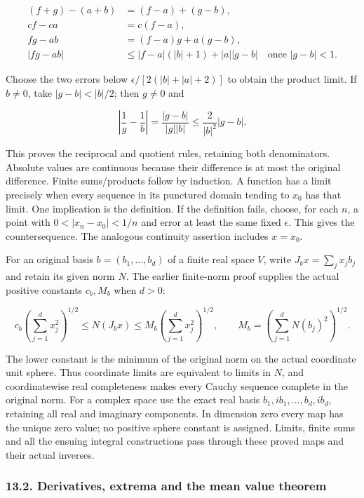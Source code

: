 \documentclass[
  11pt,
]{article}
\begin{document}
\[
\begin{aligned}
 (f+g)-(a+b)&=(f-a)+(g-b),\\
 cf-ca&=c(f-a),\\
 fg-ab&=(f-a)g+a(g-b),\\
 |fg-ab|&\le |f-a|(|b|+1)+|a||g-b|
 \quad\text{once }|g-b|<1.
\end{aligned}\tag{OC1}
\]

Choose the two errors below \(\epsilon/[2(|b|+|a|+2)]\) to obtain the
product limit. If \(b\ne0\), take \(|g-b|<|b|/2\); then \(g\ne0\) and

\[
 \left|\frac1g-\frac1b\right|
 =\frac{|g-b|}{|g||b|}
 \le\frac{2}{|b|^2}|g-b|.
\tag{OC2}
\]

This proves the reciprocal and quotient rules, retaining both
denominators. Absolute values are continuous because their difference is
at most the original difference. Finite sums/products follow by
induction. A function has a limit precisely when every sequence in its
punctured domain tending to \(x_0\) has that limit. One implication is
the definition. If the definition fails, choose, for each \(n\), a point
with \(0<|x_n-x_0|<1/n\) and error at least the same fixed \(\epsilon\).
This gives the countersequence. The analogous continuity assertion
includes \(x=x_0\).

For an original basis \(b=(b_1,\ldots,b_d)\) of a finite real space
\(V\), write \(J_bx=\sum_jx_jb_j\) and retain its given norm \(N\). The
earlier finite-norm proof supplies the actual positive constants
\(c_b,M_b\) when \(d>0\):

\[
 c_b\left(\sum_{j=1}^d x_j^2\right)^{1/2}
 \le N(J_bx)\le
 M_b\left(\sum_{j=1}^d x_j^2\right)^{1/2},
 \qquad
 M_b=\left(\sum_{j=1}^d N(b_j)^2\right)^{1/2}.
\tag{OC3}
\]

The lower constant is the minimum of the original norm on the actual
coordinate unit sphere. Thus coordinate limits are equivalent to limits
in \(N\), and coordinatewise real completeness makes every Cauchy
sequence complete in the original norm. For a complex space use the
exact real basis \(b_1,ib_1,\ldots,b_d,ib_d\), retaining all real and
imaginary components. In dimension zero every map has the unique zero
value; no positive sphere constant is assigned. Limits, finite sums and
all the ensuing integral constructions pass through these proved maps
and their actual inverses.

\subsubsection{13.2. Derivatives, extrema and the mean value
theorem}\label{derivatives-extrema-and-the-mean-value-theorem}
\end{document}
